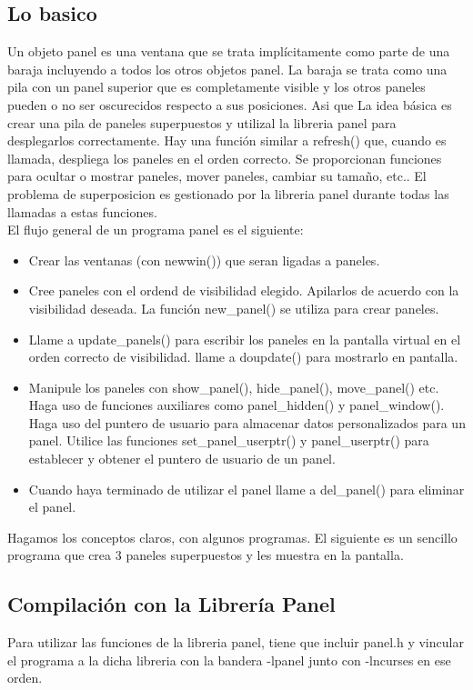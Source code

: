\documentclass{article}
\begin{document}
\subsection{Lo basico}%
Un objeto panel es una ventana que se trata implícitamente como parte de una
baraja incluyendo a todos los otros objetos panel. La baraja se trata como una
pila con un panel superior que es completamente visible y los otros paneles
pueden o no ser oscurecidos respecto a sus posiciones. Asi que La idea básica
es crear una pila de paneles superpuestos y utilizal la libreria panel para
desplegarlos correctamente. Hay una función similar a refresh() que, cuando es
llamada, despliega los paneles en el orden correcto. Se proporcionan funciones
para ocultar o mostrar paneles, mover paneles, cambiar su tamaño, etc.. El
problema de superposicion es gestionado por la libreria panel durante todas las
llamadas a estas funciones.\\

El flujo general de un programa panel es el siguiente:
\begin{itemize}
  \item Crear las ventanas (con newwin()) que seran ligadas a paneles.
  \item Cree paneles con el ordend de visibilidad elegido. Apilarlos de acuerdo
    con la visibilidad deseada. La función new\_panel() se utiliza para crear
    paneles.
  \item Llame a update\_panels() para escribir los paneles en la pantalla
    virtual en el orden correcto de visibilidad. llame a doupdate() para
    mostrarlo en pantalla.
  \item Manipule los paneles con show\_panel(), hide\_panel(), move\_panel() etc.
    Haga uso de funciones auxiliares como panel\_hidden() y panel\_window(). Haga
    uso del puntero de usuario para almacenar datos personalizados para un
    panel. Utilice las funciones set\_panel\_userptr() y panel\_userptr() para
    establecer y obtener el puntero de usuario de un panel.
  \item Cuando haya terminado de utilizar el panel llame a del\_panel() para
    eliminar el panel.
\end{itemize}

Hagamos los conceptos claros, con algunos programas. El siguiente es un
sencillo programa que crea 3 paneles superpuestos y les muestra en la pantalla.

\subsection{Compilación con la Librería Panel}%
Para utilizar las funciones de la libreria panel, tiene que incluir panel.h y
vincular el programa a la dicha libreria con la bandera -lpanel junto con
-lncurses en ese orden.
\end{document}
